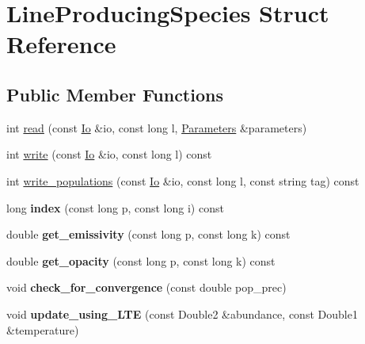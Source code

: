 \hypertarget{structLineProducingSpecies}{}\section{Line\+Producing\+Species Struct Reference}
\label{structLineProducingSpecies}
\subsection*{Public Member Functions}
\begin{DoxyCompactItemize}
\item 
int \mbox{\hyperlink{structLineProducingSpecies_a682268d3085f8ca3d24b278df757f141}{read}} (const \mbox{\hyperlink{structIo}{Io}} \&io, const long l, \mbox{\hyperlink{classParameters}{Parameters}} \&parameters)
\item 
int \mbox{\hyperlink{structLineProducingSpecies_a9152eaa80ee71288e3bdc05e749939b6}{write}} (const \mbox{\hyperlink{structIo}{Io}} \&io, const long l) const
\item 
int \mbox{\hyperlink{structLineProducingSpecies_ab6062b14b7d076bffedb96b3d61fc1d4}{write\+\_\+populations}} (const \mbox{\hyperlink{structIo}{Io}} \&io, const long l, const string tag) const
\item 
\mbox{\label{structLineProducingSpecies_a1ef68cebbf968f57e3190f385cfda6e6}} 
long {\bfseries index} (const long p, const long i) const
\item 
\mbox{\label{structLineProducingSpecies_a17b5c3f00749cdcff0f575fcd99fd92a}} 
double {\bfseries get\+\_\+emissivity} (const long p, const long k) const
\item 
\mbox{\label{structLineProducingSpecies_a83d52693fc6a050402fe93ccdcd47500}} 
double {\bfseries get\+\_\+opacity} (const long p, const long k) const
\item 
\mbox{\label{structLineProducingSpecies_a7b7415df082a8dc660fde417ece3aced}} 
void {\bfseries check\+\_\+for\+\_\+convergence} (const double pop\+\_\+prec)
\item 
\mbox{\label{structLineProducingSpecies_ae55c10a0b41b332d78c640bd72c169bc}} 
void {\bfseries update\+\_\+using\+\_\+\+L\+TE} (const Double2 \&abundance, const Double1 \&temperature)

\end{DoxyCompactItemize}
